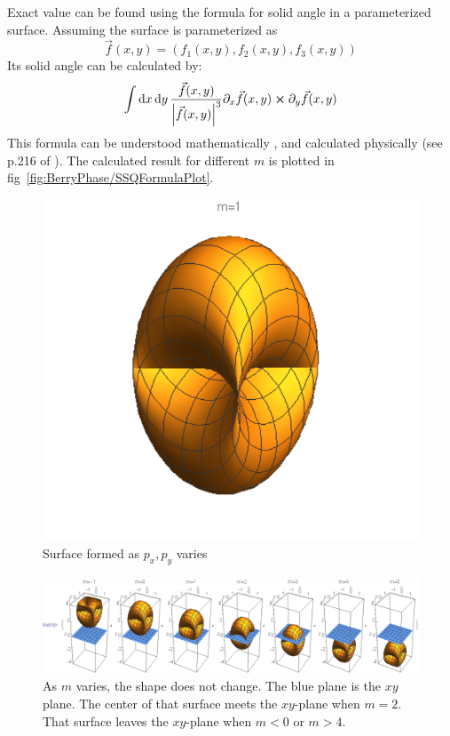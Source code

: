 \documentclass{article}
\begin{document}
    Exact value can be found using the formula for solid angle in a
    parameterized surface. Assuming the surface is parameterized as
    \begin{equation}
        \vec{f}(x,y) = (f_1(x,y), f_2(x,y), f_3(x,y))
    \end{equation}
    Its solid angle can be calculated by:
    \begin{equation}
        \int\dd{x}\dd{y} \frac{\vec{f}(x,y)}{\abs{\vec{f}(x,y)}^3}
        \partial_x \vec{f}(x,y) \cross \partial_y \vec{f}(x,y)
    \end{equation}
    This formula can be understood mathematically
    \cite{SolidAngleParameterizedSurface}, and calculated physically (see p.216 of
    \cite{Shen2012}).  The calculated result for different $m$ is plotted in
    fig~\ref{fig:BerryPhase/SSQFormulaPlot}.
    \begin{figure}[htpb]
        \centering
        \includegraphics[width=0.5\linewidth]{pics/BerryPhase/Shape.pdf}
        \caption{Surface formed as $p_x,p_y$ varies}
        \label{fig:BerryPhase/Shape}
    \end{figure}
    \begin{figure}[htpb]
        \centering
        \includegraphics[width=0.8\linewidth]{pics/BerryPhase/AsMVaries.pdf}
        \caption{As $m$ varies, the shape does not change. The blue plane is the
        $xy$ plane. The center of that surface meets the $xy$-plane when $m=2$.
        That surface leaves the $xy$-plane when $m<0$ or $m>4$.}
        \label{fig:BerryPhase/AsMVaries}
    \end{figure}
\end{document}
